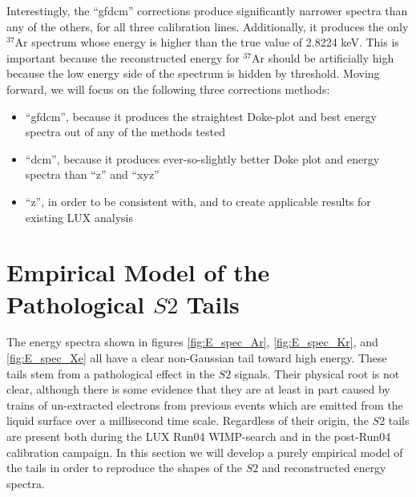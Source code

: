 {Interestingly, the ``gfdcm'' corrections produce significantly narrower spectra than any of the others, for all three calibration lines. Additionally, it produces the only $^{37}$Ar spectrum whose energy is higher than the true value of 2.8224 keV. This is important because the reconstructed energy for $^{37}$Ar should be artificially high because the low energy side of the spectrum is hidden by threshold. Moving forward, we will focus on the following three corrections methods: 
\begin{itemize}
\item ``gfdcm'', because it produces the straightest Doke-plot and best energy spectra out of any of the methods tested
\item ``dcm'', because it produces ever-so-slightly better Doke plot and energy spectra than ``z'' and ``xyz''
\item ``z'', in order to be consistent with, and to create applicable results for existing LUX analysis
\end{itemize}



\section{Empirical Model of the Pathological $S2$ Tails}\label{sec:s2tails}
The energy spectra shown in figures \ref{fig:E_spec_Ar}, \ref{fig:E_spec_Kr}, and \ref{fig:E_spec_Xe} all have a clear non-Gaussian tail toward high energy. These tails stem from a pathological effect in the $S2$ signals. Their physical root is not clear, although there is some evidence that they are at least in part caused by trains of un-extracted electrons from previous events which are emitted from the liquid surface over a millisecond time scale. Regardless of their origin, the $S2$ tails are present both during the LUX Run04 WIMP-search and in the post-Run04 calibration campaign. In this section we will develop a purely empirical model of the tails in order to reproduce the shapes of the $S2$ and reconstructed energy spectra.

}
